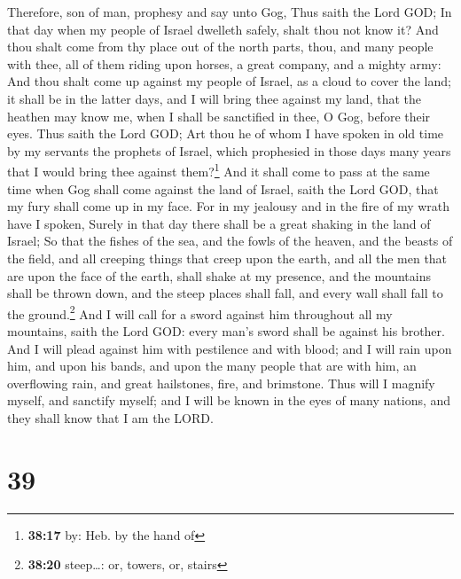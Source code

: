  Therefore, son of man, prophesy and say unto Gog, Thus
saith the Lord GOD; In that day when my people of Israel dwelleth
safely, shalt thou not know it?  And thou shalt come from
thy place out of the north parts, thou, and many people with thee, all
of them riding upon horses, a great company, and a mighty army:
 And thou shalt come up against my people of Israel, as a
cloud to cover the land; it shall be in the latter days, and I will
bring thee against my land, that the heathen may know me, when I shall
be sanctified in thee, O Gog, before their eyes.  Thus
saith the Lord GOD; Art thou he of whom I have spoken in old time by my
servants the prophets of Israel, which prophesied in those days many
years that I would bring thee against them?\footnote{\textbf{38:17} by:
  Heb. by the hand of}  And it shall come to pass at the
same time when Gog shall come against the land of Israel, saith the Lord
GOD, that my fury shall come up in my face.  For in my
jealousy and in the fire of my wrath have I spoken, Surely in that day
there shall be a great shaking in the land of Israel;  So
that the fishes of the sea, and the fowls of the heaven, and the beasts
of the field, and all creeping things that creep upon the earth, and all
the men that are upon the face of the earth, shall shake at my presence,
and the mountains shall be thrown down, and the steep places shall fall,
and every wall shall fall to the ground.\footnote{\textbf{38:20}
  steep\ldots: or, towers, or, stairs}  And I will call
for a sword against him throughout all my mountains, saith the Lord GOD:
every man's sword shall be against his brother.  And I
will plead against him with pestilence and with blood; and I will rain
upon him, and upon his bands, and upon the many people that are with
him, an overflowing rain, and great hailstones, fire, and brimstone.
 Thus will I magnify myself, and sanctify myself; and I
will be known in the eyes of many nations, and they shall know that I am
the LORD.

\hypertarget{section-38}{%
\section{39}\label{section-38}}

